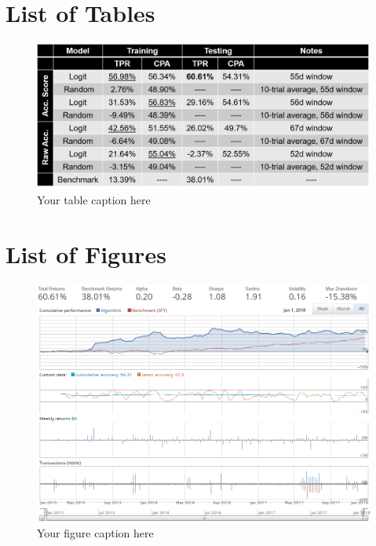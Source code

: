 \documentclass[12pt]{article}
\begin{document}
\begin{spacing}{1.9}

\section{List of Tables}

\begin{figure}[H]
    \centering
    \includegraphics[scale=0.50]{table_logit_random.png}
    \caption{Your table caption here}
    \label{tab:table_logit_random}
\end{figure}

\section{List of Figures}

\begin{figure}[H]
    \centering
    \includegraphics[scale=0.55]{results_logit.png}
    \caption{Your figure caption here}
    \label{fig:results_logit}
\end{figure}


\end{spacing}
\end{document}
